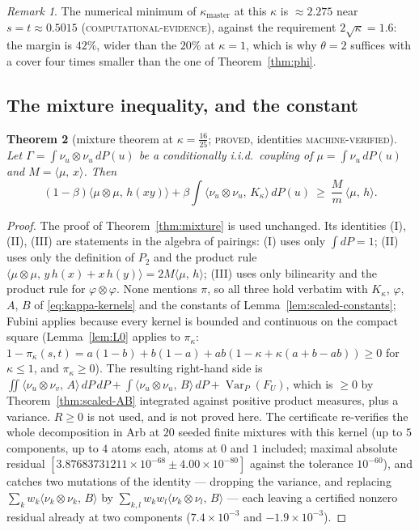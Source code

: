 \documentclass[11pt]{article}
\theoremstyle{plain}
\newtheorem{theorem}{Theorem}[section]
\theoremstyle{definition}
\theoremstyle{remark}
\newtheorem{remark}[theorem]{Remark}
\newcommand{\pr}[2]{\langle #1,\,#2\rangle}
\newcommand{\Var}{\operatorname{Var}}
\newcommand{\lbl}[1]{\textsc{#1}}
\begin{document}
\begin{remark}
The numerical minimum of $\kappa_{\mathrm{master}}$ at this $\kappa$ is $\approx2.275$ near
$s=t\approx0.5015$ (\lbl{computational-evidence}), against the requirement
$2\sqrt\kappa=1.6$: the margin is $42\%$, wider than the $20\%$ at $\kappa=1$,
which is why $\theta=2$ suffices with a cover four times smaller than the one
of Theorem~\ref{thm:phi}.
\end{remark}

\subsection{The mixture inequality, and the constant}

\begin{theorem}[mixture theorem at $\kappa=\tfrac{16}{25}$; \lbl{proved}, identities \lbl{machine-verified}]\label{thm:scaled-mixture}
Let $\Gamma=\int\nu_u\otimes\nu_u\,dP(u)$ be a conditionally i.i.d.\ coupling
of $\mu=\int\nu_u\,dP(u)$ and $M=\pr{\mu}{x}$.  Then
\[
  (1-\beta)\pr{\mu\otimes\mu}{h(xy)}+\beta\int\pr{\nu_u\otimes\nu_u}{K_\kappa}\,dP(u)
  \ \ge\ \frac{M}{m}\,\pr{\mu}{h}.
\]
\end{theorem}
\begin{proof}
The proof of Theorem~\ref{thm:mixture} is used unchanged.  Its identities
(I), (II), (III) are statements in the algebra of pairings: (I) uses only
$\int dP=1$; (II) uses only the definition of $P_2$ and the product rule
$\pr{\mu\otimes\mu}{y\,h(x)+x\,h(y)}=2M\pr{\mu}{h}$; (III) uses only
bilinearity and the product rule for $\varphi\otimes\varphi$.  None mentions
$\pi$, so all three hold verbatim with $K_\kappa$, $\varphi$, $A$, $B$ of
\eqref{eq:kappa-kernels} and the constants of
Lemma~\ref{lem:scaled-constants}; Fubini applies because every kernel is
bounded and continuous on the compact square (Lemma~\ref{lem:L0} applies to
$\pi_\kappa$: $1-\pi_\kappa(s,t)=a(1-b)+b(1-a)+ab(1-\kappa+\kappa(a+b-ab))\ge0$
for $\kappa\le1$, and $\pi_\kappa\ge0$).  The resulting right-hand side is
$\iint\pr{\nu_u\otimes\nu_v}{A}\,dP\,dP+\int\pr{\nu_u\otimes\nu_u}{B}\,dP+\Var_P(F_U)$,
which is $\ge0$ by Theorem~\ref{thm:scaled-AB} integrated against positive
product measures, plus a variance.  $R\ge0$ is not used, and is not proved
here.  The certificate re-verifies the whole decomposition in Arb at $20$
seeded finite mixtures with this kernel (up to $5$ components, up to $4$
atoms each, atoms at $0$ and $1$ included; maximal absolute residual
$[3.87683731211\times10^{-68}\pm4.00\times10^{-80}]$ against the tolerance
$10^{-60}$), and catches two mutations of the identity --- dropping the
variance, and replacing $\sum_kw_k\pr{\nu_k\otimes\nu_k}{B}$ by
$\sum_{k,l}w_kw_l\pr{\nu_k\otimes\nu_l}{B}$ --- each leaving a certified
nonzero residual already at two components ($7.4\times10^{-3}$ and
$-1.9\times10^{-3}$).
\end{proof}
\end{document}
